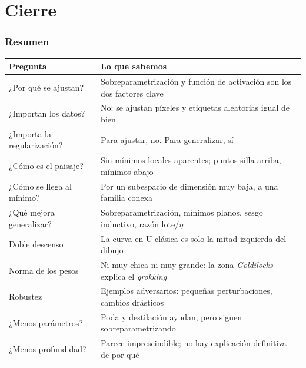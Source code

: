 \documentclass[aspectratio=169, 10pt]{beamer}
\begin{document}
\section{Cierre}

\begin{frame}
\frametitle{Resumen}
\begin{center}
\footnotesize
\begin{tabular}{ll}
\toprule
\textbf{Pregunta} & \textbf{Lo que sabemos}\\
\midrule
¿Por qu\'e se ajustan?      & Sobreparametrizaci\'on y funci\'on de activaci\'on son los dos factores clave\\
¿Importan los datos?        & No: se ajustan p\'ixeles y etiquetas aleatorias igual de bien\\
¿Importa la regularizaci\'on? & Para ajustar, no. Para generalizar, s\'i\\
¿C\'omo es el paisaje?      & Sin m\'inimos locales aparentes; puntos silla arriba, m\'inimos abajo\\
¿C\'omo se llega al m\'inimo? & Por un subespacio de dimensi\'on muy baja, a una familia conexa\\
¿Qu\'e mejora generalizar?  & Sobreparametrizaci\'on, m\'inimos planos, sesgo inductivo, raz\'on lote$/\eta$\\
Doble descenso              & La curva en U cl\'asica es solo la mitad izquierda del dibujo\\
Norma de los pesos          & Ni muy chica ni muy grande: la zona \emph{Goldilocks} explica el \emph{grokking}\\
Robustez                    & Ejemplos adversarios: peque\~nas perturbaciones, cambios dr\'asticos\\
¿Menos par\'ametros?        & Poda y destilaci\'on ayudan, pero siguen sobreparametrizando\\
¿Menos profundidad?         & Parece imprescindible; no hay explicaci\'on definitiva de por qu\'e\\
\bottomrule
\end{tabular}
\end{center}
\end{frame}
\end{document}
